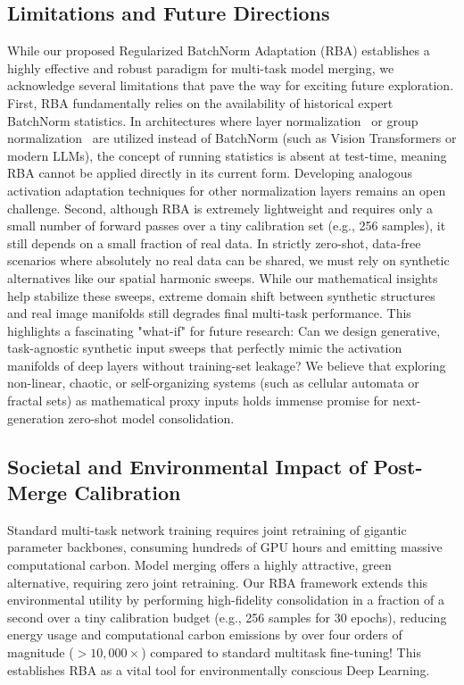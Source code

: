 \documentclass{article}
\begin{document}
\subsection{Limitations and Future Directions}
While our proposed Regularized BatchNorm Adaptation (RBA) establishes a highly effective and robust paradigm for multi-task model merging, we acknowledge several limitations that pave the way for exciting future exploration. First, RBA fundamentally relies on the availability of historical expert BatchNorm statistics. In architectures where layer normalization~\cite{ba2016layer} or group normalization~\cite{wu2018group} are utilized instead of BatchNorm (such as Vision Transformers or modern LLMs), the concept of running statistics is absent at test-time, meaning RBA cannot be applied directly in its current form. Developing analogous activation adaptation techniques for other normalization layers remains an open challenge. Second, although RBA is extremely lightweight and requires only a small number of forward passes over a tiny calibration set (e.g., 256 samples), it still depends on a small fraction of real data. In strictly zero-shot, data-free scenarios where absolutely no real data can be shared, we must rely on synthetic alternatives like our spatial harmonic sweeps. While our mathematical insights help stabilize these sweeps, extreme domain shift between synthetic structures and real image manifolds still degrades final multi-task performance. This highlights a fascinating "what-if" for future research: Can we design generative, task-agnostic synthetic input sweeps that perfectly mimic the activation manifolds of deep layers without training-set leakage? We believe that exploring non-linear, chaotic, or self-organizing systems (such as cellular automata or fractal sets) as mathematical proxy inputs holds immense promise for next-generation zero-shot model consolidation.

\subsection{Societal and Environmental Impact of Post-Merge Calibration}
Standard multi-task network training requires joint retraining of gigantic parameter backbones, consuming hundreds of GPU hours and emitting massive computational carbon. Model merging offers a highly attractive, green alternative, requiring zero joint retraining. Our RBA framework extends this environmental utility by performing high-fidelity consolidation in a fraction of a second over a tiny calibration budget (e.g., 256 samples for 30 epochs), reducing energy usage and computational carbon emissions by over four orders of magnitude ($>$$10,000\times$) compared to standard multitask fine-tuning! This establishes RBA as a vital tool for environmentally conscious Deep Learning.
\end{document}
